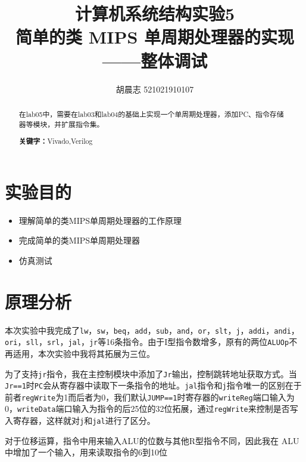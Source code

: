 \documentclass{progartcn}
\title{\bfseries\sffamily
  计算机系统结构实验5 \\ 简单的类 MIPS 单周期处理器的实现——整体调试
}
\author{胡晨志 521021910107}
\date{}
\begin{document}
\sloppy %


\maketitle
\thispagestyle{empty}

\begin{abstract}
\noindent 在lab05中，需要在lab03和lab04的基础上实现一个单周期处理器，添加PC、指令存储器等模块，并扩展指令集。

\vspace{2ex}
\noindent \textbf{关键字：}Vivado,\hspace{.5em}Verilog
\end{abstract}



\section{实验目的}

\begin{itemize}
  \item 理解简单的类MIPS单周期处理器的工作原理
  \item 完成简单的类MIPS单周期处理器
  \item 仿真测试
\end{itemize}

\section{原理分析}

本次实验中我完成了\verb|lw|，\verb|sw|，\verb|beq|，\verb|add|，\verb|sub|，\verb|and|，\verb|or|，\verb|slt|，\verb|j|，\verb|addi|，\verb|andi|，\verb|ori|，\verb|sll|，\verb|srl|，\verb|jal|，\verb|jr|等16条指令。由于I型指令数增多，原有的两位\verb|ALUOp|不再适用，本次实验中我将其拓展为三位。

为了支持\verb|jr|指令，我在主控制模块中添加了\verb|Jr|输出，控制跳转地址获取方式。当\verb|Jr==1|时\verb|PC|会从寄存器中读取下一条指令的地址。\verb|jal|指令和\verb|j|指令唯一的区别在于前者\verb|regWrite|为1而后者为0，我们默认\verb|JUMP==1|时寄存器的\verb|writeReg|端口输入为0，\verb|writeData|端口输入为指令的后25位的32位拓展，通过\verb|regWrite|来控制是否写入寄存器，这样就对\verb|j|和\verb|jal|进行了区分。

对于位移运算，指令中用来输入ALU的位数与其他R型指令不同，因此我在 ALU 中增加了一个输入，用来读取指令的6到10位
\end{document}
